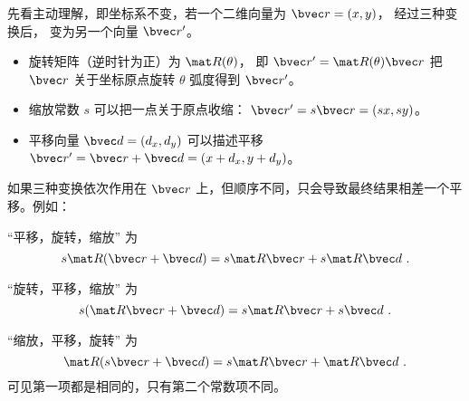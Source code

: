 

先看主动理解，即坐标系不变，若一个二维向量为 $\bvec r = (x, y)$， 经过三种变换后， 变为另一个向量 $\bvec r'$。

\begin{itemize}
\item 旋转矩阵（逆时针为正）为 $\mat R(\theta)$， 即 $\bvec r' = \mat R(\theta)\bvec r$ 把 $\bvec r$ 关于坐标原点旋转 $\theta$ 弧度得到 $\bvec r'$。
\item 缩放常数 $s$ 可以把一点关于原点收缩： $\bvec r' = s\bvec r = (sx, sy)$。
\item 平移向量 $\bvec d = (d_x,d_y)$ 可以描述平移 $\bvec r' = \bvec r + \bvec d = (x+d_x,y+d_y)$。
\end{itemize}

如果三种变换依次作用在 $\bvec r$ 上，但顺序不同，只会导致最终结果相差一个平移。例如：

“平移，旋转，缩放” 为
\begin{equation}
s\mat R (\bvec r + \bvec d) = s\mat R\bvec r + s\mat R\bvec d~.
\end{equation}

“旋转，平移，缩放” 为
\begin{equation}
s(\mat R\bvec r + \bvec d) = s\mat R\bvec r + s\bvec d~.
\end{equation}

“缩放，平移，旋转” 为
\begin{equation}
\mat R(s\bvec r + \bvec d) = s\mat R\bvec r + \mat R\bvec d~.
\end{equation}
可见第一项都是相同的，只有第二个常数项不同。

